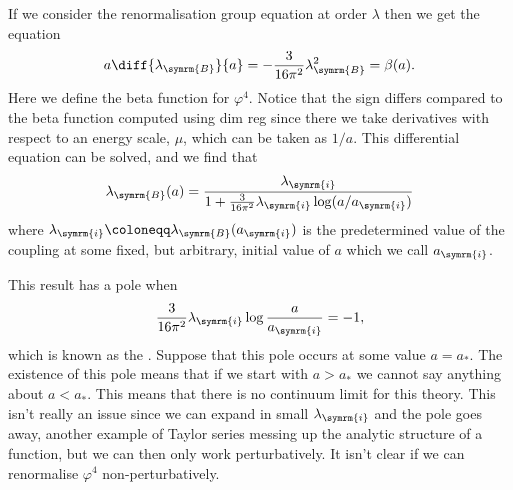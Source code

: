 \documentclass[fleqn]{NotesClass}
\newcommand{\bare}{\symrm{B}}
\begin{document}
    If we consider the renormalisation group equation at order \(\lambda\) then we get the equation
    \begin{equation}
        a\diff{\lambda_\bare}{a} = -\frac{3}{16\pi^2} \lambda_\bare^2 = \beta(a).
    \end{equation}
    Here we define the beta function for \(\varphi^4\).
    Notice that the sign differs compared to the beta function computed using dim reg since there we take derivatives with respect to an energy scale, \(\mu\), which can be taken as \(1/a\).
    This differential equation can be solved, and we find that
    \begin{equation}
        \lambda_\bare(a) = \frac{\lambda_{\symrm{i}}}{1 + \frac{3}{16\pi^2}\lambda_{\symrm{i}} \log(a/a_{\symrm{i}})}
    \end{equation}
    where \(\lambda_{\symrm{i}} \coloneqq \lambda_{\bare}(a_{\symrm{i}})\) is the predetermined value of the coupling at some fixed, but arbitrary, initial value of \(a\) which we call \(a_{\symrm{i}}\).
    
    This result has a pole when
    \begin{equation}
        \frac{3}{16\pi^2} \lambda_{\symrm{i}} \log\frac{a}{a_{\symrm{i}}} = -1,
    \end{equation}
    which is known as the .
    Suppose that this pole occurs at some value \(a = a_*\).
    The existence of this pole means that if we start with \(a > a_*\) we cannot say anything about \(a < a_*\).
    This means that there is no continuum limit for this theory.
    This isn't really an issue since we can expand in small \(\lambda_{\symrm{i}}\) and the pole goes away, another example of Taylor series messing up the analytic structure of a function, but we can then only work perturbatively.
    It isn't clear if we can renormalise \(\varphi^4\) non-perturbatively.
    
\end{document}
